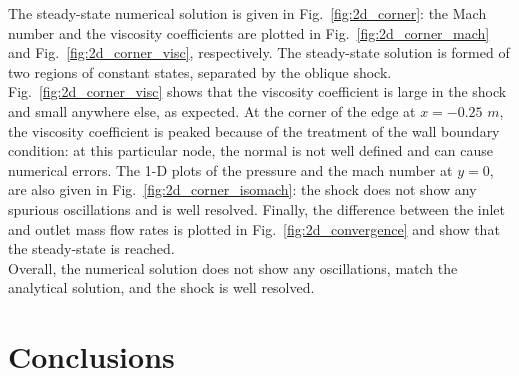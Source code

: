 \documentclass[preprint,10pt]{elsarticle}
\newcommand{\fig}[1]{Fig.~\ref{#1}}                      %
\begin{document}
%
The steady-state numerical solution is given in \fig{fig:2d_corner}: the Mach number and the viscosity coefficients are plotted in \fig{fig:2d_corner_mach} and \fig{fig:2d_corner_visc}, respectively. The steady-state solution is formed of two regions of constant states, separated by the oblique shock. \fig{fig:2d_corner_visc} shows that the viscosity coefficient is large in the shock and small anywhere else, as expected. At the corner of the edge at $x=-0.25$ $m$, the viscosity coefficient is peaked because of the treatment of the wall boundary condition: at this particular node, the normal is not well defined and can cause numerical errors. The 1-D plots of the pressure and the mach number at $y=0$, are also given in \fig{fig:2d_corner_isomach}: the shock does not show any spurious oscillations and is well resolved. Finally, the difference between the inlet and outlet mass flow rates is plotted in \fig{fig:2d_convergence} and show that the steady-state is reached. \\
Overall, the numerical solution does not show any oscillations, match the analytical solution, and the shock is well resolved.

\section{Conclusions} \label{sec:ccl}
\end{document}
